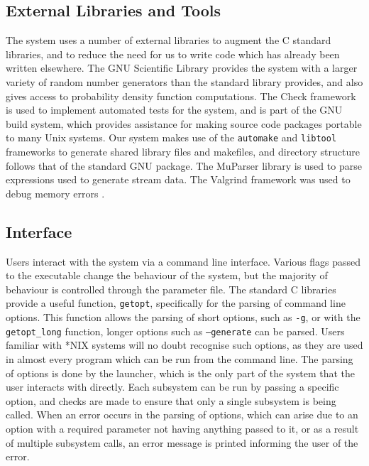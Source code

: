 \documentclass[a4paper,11pt,twoside]{article}
\begin{document}
\subsection{External Libraries and Tools}
\label{sec-6-4}

   The system uses a number of external libraries to augment the C standard
   libraries, and to reduce the need for us to write code which has already been
   written elsewhere. The GNU Scientific Library \cite{gsl} provides the system
   with a larger variety of random number generators than the standard library
   provides, and also gives access to probability density function
   computations. The Check framework \cite{check} is used to implement automated
   tests for the system, and is part of the GNU build system, which provides
   assistance for making source code packages portable to many Unix systems. Our
   system makes use of the \texttt{automake} and \texttt{libtool} frameworks to
   generate shared library files and makefiles, and directory structure follows
   that of the standard GNU package. The MuParser library \cite{muparser} is
   used to parse expressions used to generate stream data. The Valgrind
   framework was used to debug memory errors \cite{valgrind}.
\subsection{Interface}
\label{sec-6-5}

   Users interact with the system via a command line interface. Various flags
   passed to the executable change the behaviour of the system, but the majority
   of behaviour is controlled through the parameter file. The standard C
   libraries provide a useful function, \texttt{getopt}, specifically for the
   parsing of command line options. This function allows the parsing of short
   options, such as \texttt{-g}, or with the \texttt{getopt\_long} function,
   longer options such as \texttt{--generate} can be parsed. Users familiar with
   *NIX systems will no doubt recognise such options, as they are used in almost
   every program which can be run from the command line. The parsing of options
   is done by the launcher, which is the only part of the system that the user
   interacts with directly. Each subsystem can be run by passing a specific
   option, and checks are made to ensure that only a single subsystem is being
   called. When an error occurs in the parsing of options, which can arise due
   to an option with a required parameter not having anything passed to it, or
   as a result of multiple subsystem calls, an error message is printed
   informing the user of the error.
   
\end{document}

